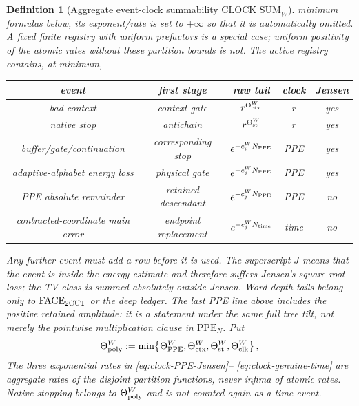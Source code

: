 \documentclass[11pt]{article}
\newtheorem{definition}[theorem]{Definition}
\begin{document}
\begin{definition}[Aggregate event-clock summability
$\mathrm{CLOCK\_SUM}_{W}$]
minimum formulas below, its exponent/rate is set to $+\infty$ so that it is
automatically omitted.  A fixed finite registry with uniform prefactors is a special case;
uniform positivity of the atomic rates without these partition bounds is not.
The active registry contains, at minimum,
\begin{center}
\begin{tabular}{c|c|c|c|c}
event & first stage & raw tail & clock & Jensen\\ \hline
bad context & context gate & $r^{\Theta_{\rm ctx}^W}$ & $r$ & yes\\
native stop & antichain & $r^{\Theta_{\rm st}^W}$ & $r$ & yes\\
buffer/gate/continuation & corresponding stop & $e^{-c_i^WN_{\rm PPE}}$ & PPE & yes\\
adaptive-alphabet energy loss & physical gate & $e^{-c_j^WN_{\rm PPE}}$ & PPE & yes\\
PPE absolute remainder & retained descendant & $e^{-c_j^WN_{\rm PPE}}$ & PPE & no\\
contracted-coordinate main error & endpoint replacement & $e^{-c_j^WN_{\rm time}}$ & time & no
\end{tabular}
\end{center}
Any further event must add a row before it is used.
The superscript $J$ means that the event is inside the energy estimate and
therefore suffers Jensen's square-root loss; the TV class is summed
absolutely outside Jensen.  Word-depth tails belong only to
$\mathrm{FACE}_{\rm 2CUT}$ or the deep ledger.  The last PPE line above includes
the positive retained amplitude: it is a statement
under the same full tree tilt, not merely the pointwise multiplication
clause in $\mathrm{PPE}_{N}$.  Put
\begin{equation}
\label{eq:weighted-energy-rates}
 \Theta_{\rm poly}^{W}:=\min\!\left\{\Theta_{\rm PPE}^{W},
       \Theta_{\rm ctx}^{W},\Theta_{\rm st}^{W},
       \Theta_{\rm clk}^{W}\right\},
\end{equation}
The three exponential rates in \eqref{eq:clock-PPE-Jensen}--
\eqref{eq:clock-genuine-time} are aggregate rates of the disjoint partition
functions, never infima of atomic rates.  Native stopping belongs to
$\Theta_{\rm poly}^{W}$ and is not counted again as a time event.


\end{definition}
\end{document}
